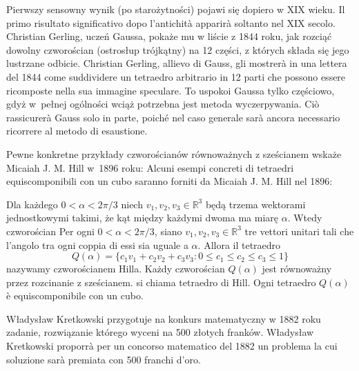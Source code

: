 Pierwszy sensowny wynik (po starożytności) pojawi się dopiero w XIX wieku. %
Il primo risultato significativo dopo l'antichità apparirà soltanto nel XIX secolo. %
Christian Gerling, uczeń Gaussa, pokaże mu w liście z 1844 roku, jak rozciąć dowolny czworościan (ostrosłup trójkątny) na 12 części, z których składa się jego lustrzane odbicie. %
Christian Gerling, allievo di Gauss, gli mostrerà in una lettera del 1844 come suddividere un tetraedro arbitrario in 12 parti che possono essere ricomposte nella sua immagine speculare. %
To uspokoi Gaussa tylko częściowo, gdyż w~pełnej ogólności wciąż potrzebna jest metoda wyczerpywania. %
Ciò rassicurerà Gauss solo in parte, poiché nel caso generale sarà ancora necessario ricorrere al metodo di esaustione. %

Pewne konkretne przykłady czworościanów równoważnych z sześcianem wskaże Micaiah J. M. Hill w~1896 roku: %
Alcuni esempi concreti di tetraedri equiscomponibili con un cubo saranno forniti da Micaiah J. M. Hill nel 1896: %

\begin{example}
    Dla każdego $0 < \alpha < 2\pi / 3$ niech $v_1, v_2, v_3 \in \mathbb R^3$ będą trzema wektorami jednostkowymi takimi, że kąt między każdymi dwoma ma miarę $\alpha$. %
    Wtedy czworościan %
    Per ogni $0 < \alpha < 2\pi / 3$, siano $v_1, v_2, v_3 \in \mathbb R^3$ tre vettori unitari tali che l'angolo tra ogni coppia di essi sia uguale a $\alpha$. %
    Allora il tetraedro %
    \begin{equation}
        Q(\alpha) = \{c_1 v_1 + c_2 v_2 + c_3 v_3 : 0 \le c_1 \le c_2 \le c_3 \le 1\}
    \end{equation}
    nazywamy czworościanem Hilla. %
    Każdy czworościan $Q(\alpha)$ jest równoważny przez rozcinanie z sześcianem. %
    si chiama tetraedro di Hill. %
    Ogni tetraedro $Q(\alpha)$ è equiscomponibile con un cubo. %
\end{example}

Władysław Kretkowski \cite{kretkowski_1880} przygotuje na konkurs matematyczny w 1882 roku zadanie, rozwiązanie którego wyceni na 500 złotych franków. %
Władysław Kretkowski \cite{kretkowski_1880} proporrà per un concorso matematico del 1882 un problema la cui soluzione sarà premiata con 500 franchi d'oro. %

